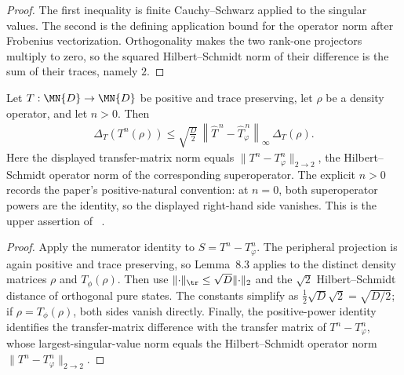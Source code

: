 \begin{proof}\leanok
    The first inequality is finite Cauchy--Schwarz applied to the singular
    values. The second is the defining application bound for the operator norm
    after Frobenius vectorization. Orthogonality makes the two rank-one
    projectors multiply to zero, so the squared Hilbert--Schmidt norm of their
    difference is the sum of their traces, namely $2$.
\end{proof}

\begin{theorem}
    \label{thm:trace_norm_asymptotic_distance_upper}
    \leanok
    Let $T:\MN{D}\to\MN{D}$ be positive and trace preserving, let $\rho$ be
    a density operator, and let $n>0$. Then
    \begin{align}
        \Delta_T(T^n(\rho))
        \leq \sqrt{\frac D2}\,
        \left\lVert \widehat T^{\,n}-\widehat T_\varphi^{\,n}\right\rVert_\infty\,
        \Delta_T(\rho).
        \tag{8.112}
    \end{align}
    Here the displayed transfer-matrix norm equals
    $\lVert T^n-T_\varphi^n\rVert_{2\to2}$, the Hilbert--Schmidt operator norm
    of the corresponding superoperator.
    The explicit $n>0$ records the paper's positive-natural convention: at
    $n=0$, both superoperator powers are the identity, so the displayed
    right-hand side vanishes. This is the upper assertion of~
    \cite[Chapter~8, Proposition ``Convergence towards asymptotic states'',
        Eqs.~(8.112), (8.114)--(8.116)]{Wolf2012Quantum}.
\end{theorem}

\begin{proof}\leanok
    Apply the numerator identity to $S=T^n-T_\varphi^n$. The peripheral
    projection is again positive and trace preserving, so Lemma~8.3 applies to
    the distinct density matrices $\rho$ and $T_\phi(\rho)$. Then use
    $\lVert\cdot\rVert_{\tr}\leq\sqrt D\lVert\cdot\rVert_2$ and the
    $\sqrt2$ Hilbert--Schmidt distance of orthogonal pure states. The constants
    simplify as $\frac12\sqrt D\sqrt2=\sqrt{D/2}$; if
    $\rho=T_\phi(\rho)$, both sides vanish directly. Finally, the
    positive-power identity identifies the transfer-matrix difference with
    the transfer matrix of $T^n-T_\varphi^n$, whose largest-singular-value norm
    equals the Hilbert--Schmidt operator norm
    $\lVert T^n-T_\varphi^n\rVert_{2\to2}$.
\end{proof}

